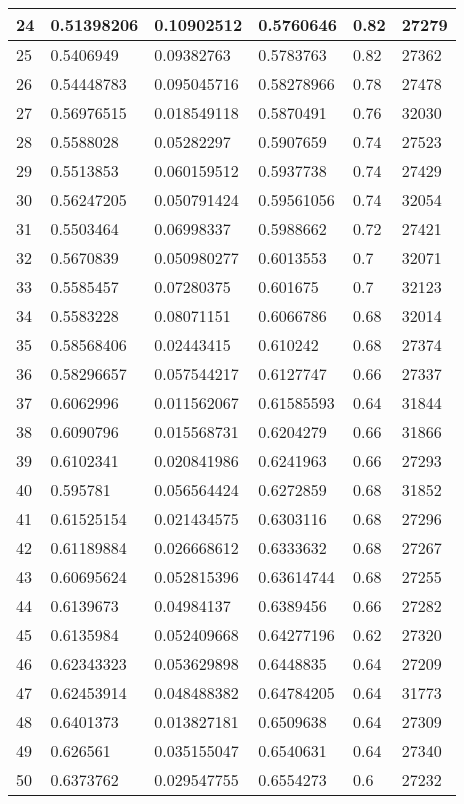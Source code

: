 \begin{longtable}{|l|l|l|l|l|l|}
24 & 0.51398206 & 0.10902512 & 0.5760646 & 0.82 & 27279 \\ \hline 
25 & 0.5406949 & 0.09382763 & 0.5783763 & 0.82 & 27362 \\ \hline 
26 & 0.54448783 & 0.095045716 & 0.58278966 & 0.78 & 27478 \\ \hline 
27 & 0.56976515 & 0.018549118 & 0.5870491 & 0.76 & 32030 \\ \hline 
28 & 0.5588028 & 0.05282297 & 0.5907659 & 0.74 & 27523 \\ \hline 
29 & 0.5513853 & 0.060159512 & 0.5937738 & 0.74 & 27429 \\ \hline 
30 & 0.56247205 & 0.050791424 & 0.59561056 & 0.74 & 32054 \\ \hline 
31 & 0.5503464 & 0.06998337 & 0.5988662 & 0.72 & 27421 \\ \hline 
32 & 0.5670839 & 0.050980277 & 0.6013553 & 0.7 & 32071 \\ \hline 
33 & 0.5585457 & 0.07280375 & 0.601675 & 0.7 & 32123 \\ \hline 
34 & 0.5583228 & 0.08071151 & 0.6066786 & 0.68 & 32014 \\ \hline 
35 & 0.58568406 & 0.02443415 & 0.610242 & 0.68 & 27374 \\ \hline 
36 & 0.58296657 & 0.057544217 & 0.6127747 & 0.66 & 27337 \\ \hline 
37 & 0.6062996 & 0.011562067 & 0.61585593 & 0.64 & 31844 \\ \hline 
38 & 0.6090796 & 0.015568731 & 0.6204279 & 0.66 & 31866 \\ \hline 
39 & 0.6102341 & 0.020841986 & 0.6241963 & 0.66 & 27293 \\ \hline 
40 & 0.595781 & 0.056564424 & 0.6272859 & 0.68 & 31852 \\ \hline 
41 & 0.61525154 & 0.021434575 & 0.6303116 & 0.68 & 27296 \\ \hline 
42 & 0.61189884 & 0.026668612 & 0.6333632 & 0.68 & 27267 \\ \hline 
43 & 0.60695624 & 0.052815396 & 0.63614744 & 0.68 & 27255 \\ \hline 
44 & 0.6139673 & 0.04984137 & 0.6389456 & 0.66 & 27282 \\ \hline 
45 & 0.6135984 & 0.052409668 & 0.64277196 & 0.62 & 27320 \\ \hline 
46 & 0.62343323 & 0.053629898 & 0.6448835 & 0.64 & 27209 \\ \hline 
47 & 0.62453914 & 0.048488382 & 0.64784205 & 0.64 & 31773 \\ \hline 
48 & 0.6401373 & 0.013827181 & 0.6509638 & 0.64 & 27309 \\ \hline 
49 & 0.626561 & 0.035155047 & 0.6540631 & 0.64 & 27340 \\ \hline 
50 & 0.6373762 & 0.029547755 & 0.6554273 & 0.6 & 27232 \\ \hline 
\end{longtable}